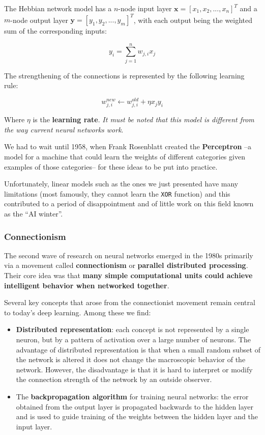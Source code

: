 The Hebbian network model has a $n$-node input layer $\boldsymbol{x} = \left[x_1,x_2,...,x_n \right]^T$ and a $m$-node output layer $\boldsymbol{y} = \left[ y_1,y_2, ... ,y_m \right]^T$, with each output being the weighted sum of the corresponding inputs:

\begin{equation*}
    y_i = \sum_{j=1}^{n} w_{j,i} x_j 
\end{equation*}

The strengthening of the connections is represented by the following learning rule:

\begin{equation*}
    w_{j,i}^{new} \leftarrow w_{j,i}^{old} + \eta x_j y_i
\end{equation*}

Where $\eta$ is the \textbf{learning rate}. \emph{It must be noted that this model is different from the way current neural networks work}.

We had to wait until 1958, when Frank Rosenblatt created the \textbf{Perceptron} --a model for a machine that could learn the weights of different categories given examples of those categories-- for these ideas to be put into practice. 

Unfortunately, linear models such as the ones we just presented have many limitations (most famously, they cannot learn the \texttt{XOR} function) and this contributed to a period of disappointment and of little work on this field known as the “AI winter”.

\subsubsection{Connectionism}
The second wave of research on neural networks emerged in the 1980s primarily via a movement called \textbf{connectionism} or \textbf{parallel distributed processing}. Their core idea was that \textbf{many simple computational units could achieve intelligent behavior when networked together}. 

Several key concepts that arose from the connectionist movement remain central to today’s deep learning. Among these we find:

\begin{itemize}
    \item \textbf{Distributed representation}: each concept is not represented by a single neuron, but by a pattern of activation over a large number of neurons. The advantage of distributed representation is that when a small random subset of the network is altered it does not change the macroscopic behavior of the network. However, the disadvantage is that it is hard to interpret or modify the connection strength of the network by an outside observer.
    \item The \textbf{backpropagation algorithm} for training neural networks: the error obtained from the output layer is propagated backwards to the hidden layer and is used to guide training of the weights between the hidden layer and the input layer.
\end{itemize}


